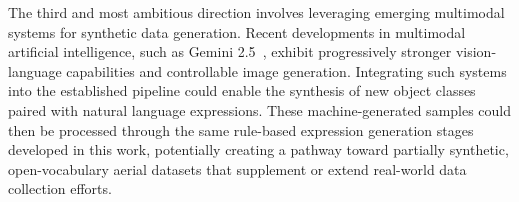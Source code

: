 The third and most ambitious direction involves leveraging emerging multimodal systems for synthetic data generation. Recent developments in multimodal artificial intelligence, such as Gemini 2.5~\cite{gemini25}, exhibit progressively stronger vision-language capabilities and controllable image generation. Integrating such systems into the established pipeline could enable the synthesis of new object classes paired with natural language expressions. These machine-generated samples could then be processed through the same rule-based expression generation stages developed in this work, potentially creating a pathway toward partially synthetic, open-vocabulary aerial datasets that supplement or extend real-world data collection efforts.